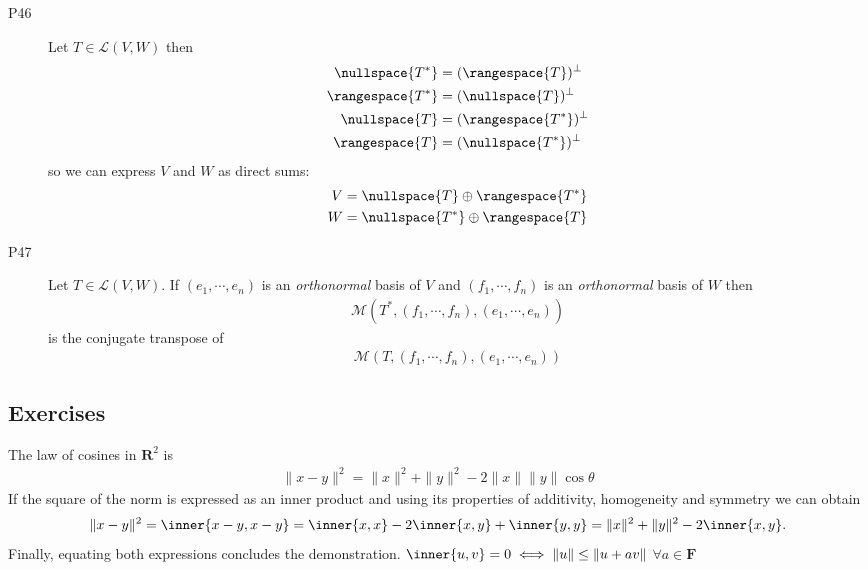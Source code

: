 \begin{description}
\item[P46\label{itm:P6_46}] Let $T\in\mathcal{L}(V,W)$ then
\begin{align*}
\nullspace{T^*} &= (\rangespace{T})^\perp \\
\rangespace{T^*} &= (\nullspace{T})^\perp \\
\nullspace{T} &= (\rangespace{T^*})^\perp\\
\rangespace{T} &= (\nullspace{T^*})^\perp
\end{align*}
so we can express $V$ and $W$ as direct sums:
\begin{align*}
V = \nullspace{T} \oplus \rangespace{T^*} \\
W = \nullspace{T^*} \oplus \rangespace{T}
\end{align*}

\item[P47\label{itm:P6_47}] Let  $T\in\mathcal{L}(V,W)$. If $(e_1,\cdots,e_n)$ is an \emph{orthonormal} basis of $V$ and $(f_1,\cdots,f_n)$ is an \emph{orthonormal} basis of $W$ then
\begin{align*}
\mathcal{M}\left(T^*, (f_1,\cdots,f_n),(e_1,\cdots,e_n)\right)
\end{align*}
is the conjugate transpose of
\begin{align*}
\mathcal{M}\left(T, (f_1,\cdots,f_n),(e_1,\cdots,e_n)\right)
\end{align*}
\end{description}

\subsection*{Exercises}
\setcounter{paragraph}{0}

\exo{} The law of cosines in $\mathbf{R}^2$ is
\begin{align*}
\|x-y\|^2 = \|x\|^2 + \|y\|^2 - 2\|x\|\|y\| \cos{\theta}
\end{align*}
If the square of the norm is expressed as an inner product and using its properties of additivity, homogeneity and symmetry we can obtain
\begin{align*}
\|x-y\|^2 = \inner{x-y,x-y} = \inner{x,x} - 2\inner{x,y} + \inner{y,y} = \|x\|^2 + \|y\|^2 - 2\inner{x,y}.
\end{align*}
Finally, equating both expressions concludes the demonstration.
\exo{} $\inner{u,v}=0 \iff \|u\| \leq \|u+av\|$  $ \forall a\in\mathbf{F}$

